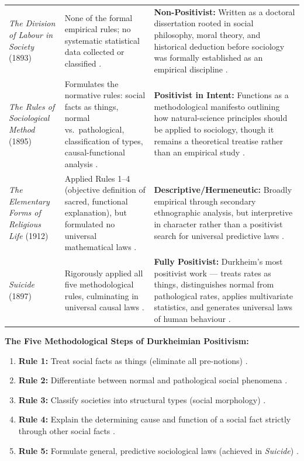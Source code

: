 \begin{table}[htbp]
\centering
\small
\begin{tabularx}{\textwidth}{l Y Y}
\toprule
{}
 &  &  \\
\midrule
\textit{The Division of Labour in Society} (1893) & None of the formal empirical rules; no systematic statistical data collected or classified . & \textbf{Non-Positivist:} Written as a doctoral dissertation rooted in social philosophy, moral theory, and historical deduction before sociology was formally established as an empirical discipline . \\
\textit{The Rules of Sociological Method} (1895) & Formulates the normative rules: social facts as things, normal vs.\ pathological, classification of types, causal-functional analysis . & \textbf{Positivist in Intent:} Functions as a methodological manifesto outlining how natural-science principles should be applied to sociology, though it remains a theoretical treatise rather than an empirical study . \\
\textit{The Elementary Forms of Religious Life} (1912) & Applied Rules 1--4 (objective definition of sacred, functional explanation), but formulated no universal mathematical laws . & \textbf{Descriptive/Hermeneutic:} Broadly empirical through secondary ethnographic analysis, but interpretive in character rather than a positivist search for universal predictive laws . \\
\textit{Suicide} (1897) & Rigorously applied all five methodological rules, culminating in universal causal laws . & \textbf{Fully Positivist:} Durkheim's most positivist work --- treats rates as things, distinguishes normal from pathological rates, applies multivariate statistics, and generates universal laws of human behaviour . \\
\bottomrule
\end{tabularx}
\end{table}

\begin{QuickRevision}
\textbf{The Five Methodological Steps of Durkheimian Positivism:}
\begin{enumerate}
    \item \textbf{Rule 1:} Treat social facts as things (eliminate all pre-notions) .
    \item \textbf{Rule 2:} Differentiate between normal and pathological social phenomena .
    \item \textbf{Rule 3:} Classify societies into structural types (social morphology) .
    \item \textbf{Rule 4:} Explain the determining cause and function of a social fact strictly through other social facts .
    \item \textbf{Rule 5:} Formulate general, predictive sociological laws (achieved in \textit{Suicide}) .
\end{enumerate}
\end{QuickRevision}

